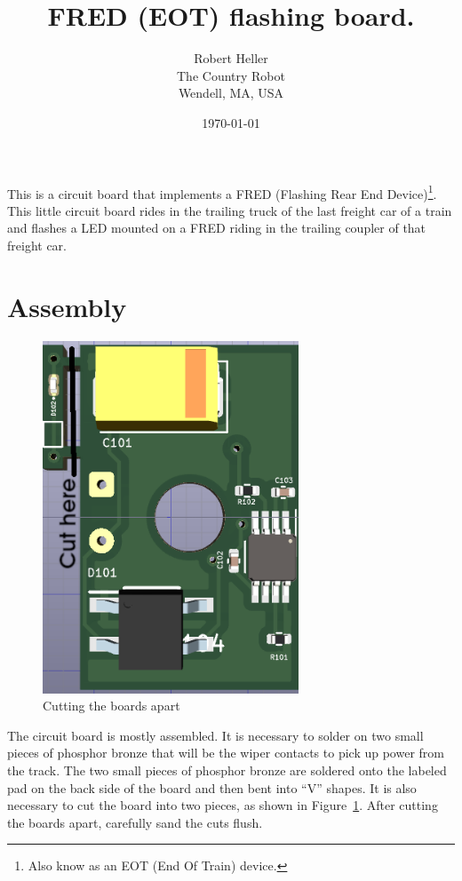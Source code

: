 \documentclass[12pt,twoside,letterpaper]{article}
\title{FRED (EOT) flashing board.}
\author{Robert Heller \\ The Country Robot \\ Wendell, MA, USA}
\date{\today}
\begin{document}
\maketitle

This is a circuit board that implements a FRED (Flashing Rear End 
Device)\footnote{Also know as an EOT (End Of Train) device.}. This little 
circuit board rides in the trailing truck of the last freight car of a train 
and flashes a LED mounted on a FRED riding in the trailing coupler of that 
freight car.

\section{Assembly}

\begin{figure}[hbpt]\begin{centering}%
\includegraphics[width=3in]{FRED_Board3D_Top_cut.png}
\caption{Cutting the boards apart}
\label{fig:boardcut}
\end{centering}\end{figure}
The circuit board is mostly assembled.  It is necessary to solder on two small 
pieces of phosphor bronze that will be the wiper contacts to pick up power 
from the track. The two small pieces of phosphor bronze are soldered onto the 
labeled pad on the back side of the board and then bent into ``V'' shapes. It 
is also necessary to cut the board into two pieces, as shown in 
Figure~\ref{fig:boardcut}. After cutting the boards apart, carefully sand the 
cuts flush.
\end{document}
